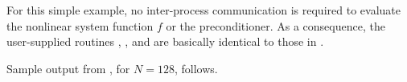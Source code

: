 For this simple example, no inter-process communication is required to
evaluate the nonlinear system function $f$ or the preconditioner. 
As a consequence, the user-supplied routines , , and
 are basically identical to those in .

Sample output from , for $N=128$, follows.


